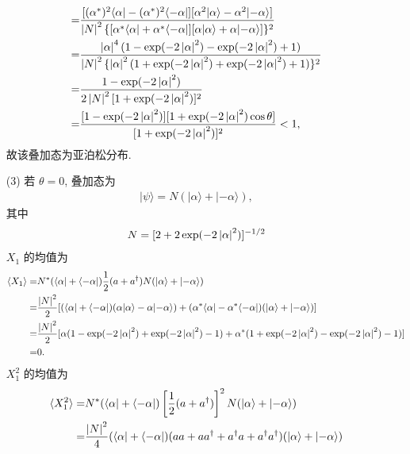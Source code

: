 \documentclass{assignment}
\begin{document}
\begin{sol}
\begin{itemize}
\begin{align}
            \notag=&\frac{[(\alpha^*)^2\langle\alpha\rvert-(\alpha^*)^2\langle-\alpha\rvert][\alpha^2\lvert\alpha\rangle-\alpha^2\lvert-\alpha\rangle]}{\left\lvert N\right\rvert^2\{[\alpha^*\langle\alpha\rvert+\alpha^*\langle-\alpha\rvert][\alpha\lvert\alpha\rangle+\alpha\lvert-\alpha\rangle]\}^2}\\
            \notag=&\frac{\left\lvert\alpha\right\rvert^4(1-\exp(-2\left\lvert\alpha\right\rvert^2)-\exp(-2\left\lvert\alpha\right\rvert^2)+1)}{\left\lvert N\right\rvert^2\{\left\lvert\alpha\right\rvert^2(1+\exp(-2\left\lvert\alpha\right\rvert^2)+\exp(-2\left\lvert\alpha\right\rvert^2)+1)\}^2}\\
            \notag=&\frac{1-\exp(-2\left\lvert\alpha\right\rvert^2)}{2\left\lvert N\right\rvert^2[1+\exp(-2\left\lvert\alpha\right\rvert^2)]^2}\\
            =&\frac{[1-\exp(-2\left\lvert\alpha\right\rvert^2)][1+\exp(-2\left\lvert\alpha\right\rvert^2)\cos\theta]}{[1+\exp(-2\left\lvert\alpha\right\rvert^2)]^2}<1,
        \end{align}
        故该叠加态为亚泊松分布.
        \item[(3)] 若 $\theta=0$, 叠加态为
        \begin{align}
            \lvert\psi\rangle=N(\lvert\alpha\rangle+\lvert-\alpha\rangle),
        \end{align}
        其中
        \begin{align}
            N=[2+2\exp(-2\left\lvert\alpha\right\rvert^2)]^{-1/2}
        \end{align}
        $X_1$ 的均值为
        \begin{align}
            \notag\langle X_1\rangle=&N^*(\langle\alpha\rvert+\langle-\alpha\rvert)\frac{1}{2}(a+a^{\dagger})N(\lvert\alpha\rangle+\lvert-\alpha\rangle)\\
            \notag=&\frac{\left\lvert N\right\rvert^2}{2}[(\langle\alpha\rvert+\langle-\alpha\rvert)(\alpha\lvert\alpha\rangle-\alpha\lvert-\alpha\rangle)+(\alpha^*\langle\alpha\rvert-\alpha^*\langle-\alpha\rvert)(\lvert\alpha\rangle+\lvert-\alpha\rangle)]\\
            \notag=&\frac{\left\lvert N\right\rvert^2}{2}[\alpha(1-\exp(-2\left\lvert\alpha\right\rvert^2)+\exp(-2\left\lvert\alpha\right\rvert^2)-1)+\alpha^*(1+\exp(-2\left\lvert\alpha\right\rvert^2)-\exp(-2\left\lvert\alpha\right\rvert^2)-1)]\\
            =&0.
        \end{align}
        $X_1^2$ 的均值为
        \begin{align}
            \notag\langle X_1^2\rangle=&N^*(\langle\alpha\rvert+\langle-\alpha\rvert)\left[\frac{1}{2}(a+a^{\dagger})\right]^2N(\lvert\alpha\rangle+\lvert-\alpha\rangle)\\
            \notag=&\frac{\abs{N}^2}{4}(\langle\alpha\rvert+\langle-\alpha\rvert)(aa+aa^{\dagger}+a^{\dagger}a+a^{\dagger}a^{\dagger})(\lvert\alpha\rangle+\lvert-\alpha\rangle)\\

\end{align}
\end{itemize}
\end{sol}
\end{document}
